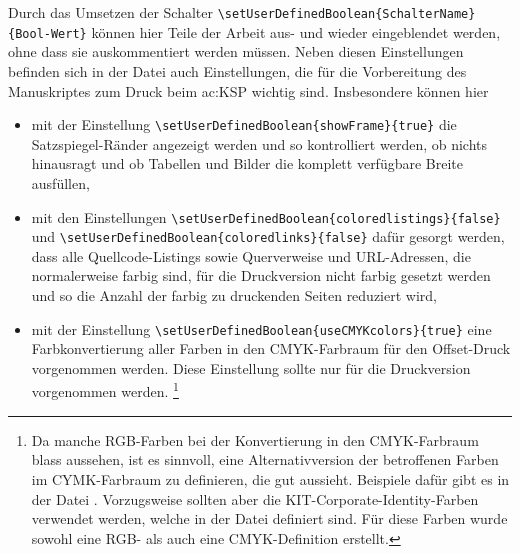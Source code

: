 Durch das Umsetzen der Schalter 
\lstinline|\setUserDefinedBoolean{SchalterName}{Bool-Wert}| 
können hier Teile der Arbeit aus- und wieder eingeblendet werden, ohne dass sie auskommentiert werden müssen.
Neben diesen Einstellungen befinden sich in der Datei  auch Einstellungen,
die für die Vorbereitung des Manuskriptes zum Druck beim \gls{ac:KSP} wichtig sind.
Insbesondere können hier
\begin{itemize}
\item mit der Einstellung
\lstinline|\setUserDefinedBoolean{showFrame}{true}|
die Satzspiegel-Ränder angezeigt werden und so kontrolliert werden,
ob nichts hinausragt und ob Tabellen und Bilder die komplett verfügbare Breite ausfüllen,
\item mit den Einstellungen
\lstinline|\setUserDefinedBoolean{coloredlistings}{false}| und 
\lstinline|\setUserDefinedBoolean{coloredlinks}{false}|
dafür gesorgt werden, dass alle Quellcode-Listings sowie Querverweise und URL-Adressen,
die normalerweise farbig sind, für die Druckversion nicht farbig gesetzt werden
und so die Anzahl der farbig zu druckenden Seiten reduziert wird,
\item mit der Einstellung
\lstinline|\setUserDefinedBoolean{useCMYKcolors}{true}|
eine Farbkonvertierung aller Farben in den CMYK-Farbraum für den Offset-Druck vorgenommen werden.
Diese Einstellung sollte nur für die Druckversion vorgenommen werden.%
\footnote{Da manche RGB-Farben bei der Konvertierung in den CMYK-Farbraum blass aussehen,
ist es sinnvoll, eine Alternativversion der betroffenen Farben im CYMK-Farbraum zu definieren,
die gut aussieht.
Beispiele dafür gibt es in der Datei .
Vorzugsweise sollten aber die KIT-Corporate-Identity-Farben verwendet werden,
welche in der Datei  definiert sind.
Für diese Farben wurde sowohl eine RGB- als auch eine CMYK-Definition erstellt.}
\end{itemize}

